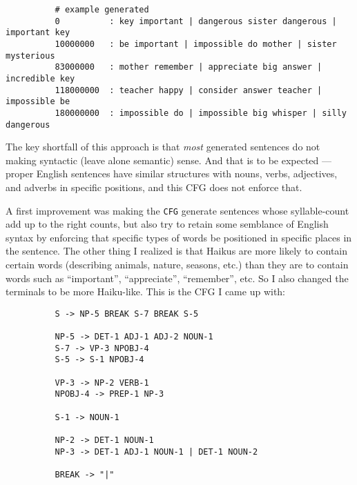 \begin{enumarabic}
    \begin{center}
      \begin{small}
        \begin{verbatim}
          # example generated
          0          : key important | dangerous sister dangerous | important key
          10000000   : be important | impossible do mother | sister mysterious
          83000000   : mother remember | appreciate big answer | incredible key
          118000000  : teacher happy | consider answer teacher | impossible be
          180000000  : impossible do | impossible big whisper | silly dangerous
        \end{verbatim} 
      \end{small}
    \end{center}
    The key shortfall of this approach is that \emph{most} generated
    sentences do not making syntactic (leave alone semantic) sense.
    And that is to be expected --- proper English sentences have similar
    structures with nouns, verbs, adjectives, and adverbs in specific
    positions, and this CFG does not enforce that.
  \item A first improvement was making the \verb|CFG| generate sentences
    whose syllable-count add up to the right counts, but also try to retain
    some semblance of English syntax by enforcing that specific types of words
    be positioned in specific places in the sentence.
    The other thing I realized is that Haikus are more likely to contain
    certain words (describing animals, nature, seasons, etc.) than they are to contain
    words such as ``important'', ``appreciate'', ``remember'', etc.
    So I also changed the terminals to be more Haiku-like.
    This is the CFG I came up with:

    \begin{center}
      \begin{small}
        \begin{verbatim}
          S -> NP-5 BREAK S-7 BREAK S-5
          
          NP-5 -> DET-1 ADJ-1 ADJ-2 NOUN-1
          S-7 -> VP-3 NPOBJ-4
          S-5 -> S-1 NPOBJ-4
          
          VP-3 -> NP-2 VERB-1
          NPOBJ-4 -> PREP-1 NP-3
          
          S-1 -> NOUN-1
          
          NP-2 -> DET-1 NOUN-1
          NP-3 -> DET-1 ADJ-1 NOUN-1 | DET-1 NOUN-2
          
          BREAK -> "|"
          

\end{verbatim}
\end{small}
\end{center}
\end{enumarabic}
